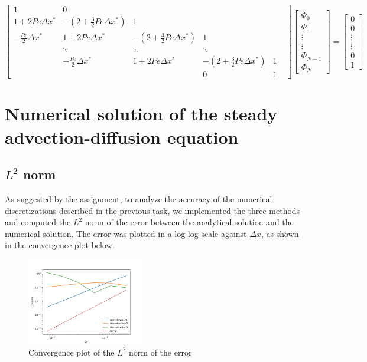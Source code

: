 \documentclass{article}
\begin{document}
\begin{equation}
    \begin{bmatrix}
        1 & 0 &  &  &  \\
        1 + 2 Pe \Delta x^*  & - (2 + \frac{3}{2} Pe \Delta x^*) & 1 &  &  \\
        - \frac{Pe}{2} \Delta x^* & 1 + 2 Pe \Delta x^*  & - (2 + \frac{3}{2} Pe \Delta x^*) & 1 &  &  \\
            &   \ddots & \ddots & \ddots & \\
        & - \frac{Pe}{2} \Delta x^* &  1 + 2 Pe \Delta x^*  & - (2 + \frac{3}{2} Pe \Delta x^*) & 1 \\
        &  & & 0 & 1
    \end{bmatrix}
    \begin{bmatrix}
        \Phi_0 \\
        \Phi_1 \\
        \vdots \\
        \vdots \\
        \Phi_{N-1} \\
        \Phi_N
    \end{bmatrix}
    = 
    \begin{bmatrix}
        0 \\
        0 \\
        \vdots \\
        \vdots \\
        0 \\
        1
    \end{bmatrix}
\end{equation}



\section{Numerical solution of the steady advection-diffusion equation}

\subsection{$L^2$ norm}
As suggested by the assignment, to analyze the accuracy of the numerical discretizations described in the previous task,
we implemented the three methods and computed the $L^2$ norm of the error between the analytical solution and the numerical solution.
The error was plotted in a log-log scale against $\Delta x$, as shown in the convergence plot below.
\begin{figure}[h!]
    \centering
    \includegraphics[width=0.45\textwidth]{task2_L2norm.png}
    \caption{Convergence plot of the $L^2$ norm of the error}
    \label{fig:L2norm}
\end{figure}
\end{document}
